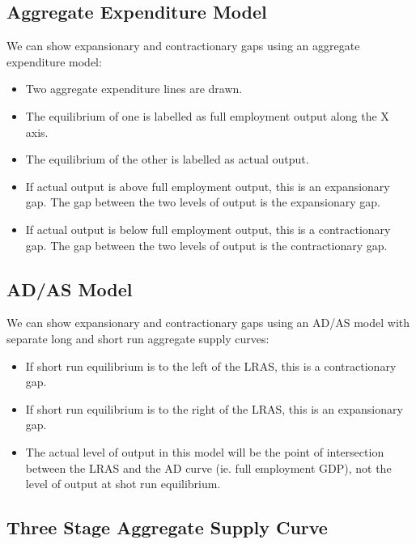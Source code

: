 \documentclass[a4paper,11pt]{article}
\begin{document}
\subsection{Aggregate Expenditure Model}


We can show expansionary and contractionary gaps using an aggregate expenditure
model:

\begin{itemize}
\item Two aggregate expenditure lines are drawn.
\item The equilibrium of one is labelled as full employment output along the X
	axis.
\item The equilibrium of the other is labelled as actual output.
\item If actual output is above full employment output, this is an expansionary
	gap. The gap between the two levels of output is the expansionary gap.
\item If actual output is below full employment output, this is a contractionary
	gap. The gap between the two levels of output is the contractionary gap.
\end{itemize}


\subsection{AD/AS Model}


We can show expansionary and contractionary gaps using an AD/AS model with
separate long and short run aggregate supply curves:

\begin{itemize}
\item If short run equilibrium is to the left of the LRAS, this is a
	contractionary gap.
\item If short run equilibrium is to the right of the LRAS, this is an
	expansionary gap.
\item The actual level of output in this model will be the point of intersection
	between the LRAS and the AD curve (ie. full employment GDP), not the level
	of output at shot run equilibrium.
\end{itemize}


\subsection{Three Stage Aggregate Supply Curve}
\end{document}
